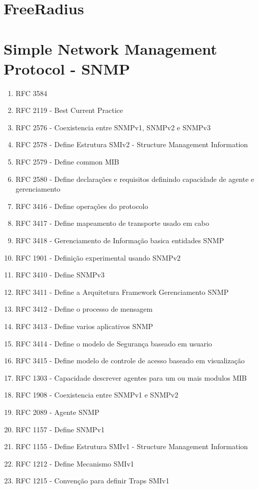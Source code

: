 \documentclass[12pt, brazil, ruledheader, pnumromarab,normaltoc]{abnt}
\begin{document}
\section{FreeRadius}



\section{Simple Network Management Protocol - SNMP} \label{sec:snmp}
\begin{enumerate}
\item RFC 3584\cite{rfc-3584-}
\item RFC 2119 - Best Current Practice
\item RFC 2576 - Coexistencia entre SNMPv1, SNMPv2 e SNMPv3\cite{rfc-2576}
\item RFC 2578 - Define Estrutura SMIv2 - Structure Management Information
\item RFC 2579 - Define common MIB
\item RFC 2580 - Define declarações e requisitos definindo capacidade de agente e gerenciamento
\item RFC 3416 - Define operações do protocolo
\item RFC 3417 - Define mapeamento de transporte usado em cabo
\item RFC 3418 - Gerenciamento de Informação basica entidades SNMP
\item RFC 1901 - Definição experimental usando SNMPv2
\item RFC 3410 - Define SNMPv3
\item RFC 3411 - Define a Arquitetura Framework Gerenciamento SNMP
\item RFC 3412 - Define o processo de mensagem
\item RFC 3413 - Define varios aplicativos SNMP
\item RFC 3414 - Define o modelo de Segurança baseado em usuario
\item RFC 3415 - Define modelo de controle de acesso baseado em visualização
\item RFC 1303 - Capacidade descrever agentes para um ou mais modulos MIB
\item RFC 1908 - Coexistencia entre SNMPv1 e SNMPv2
\item RFC 2089 - Agente SNMP

\item RFC 1157 - Define SNMPv1
\item RFC 1155 - Define Estrutura SMIv1 - Structure Management Information
\item RFC 1212 - Define Mecanismo SMIv1 
\item RFC 1215 - Convenção para definir Traps SMIv1
\end{enumerate}
\end{document}
